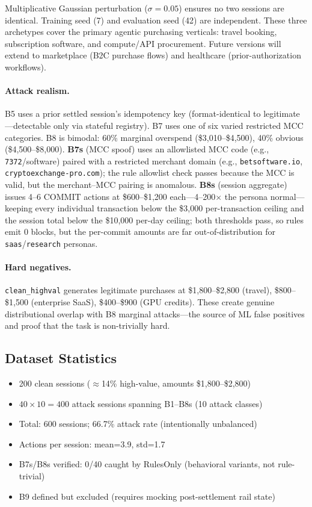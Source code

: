 \documentclass{article}
\begin{document}
Multiplicative Gaussian perturbation ($\sigma{=}0.05$) ensures no two sessions
are identical. Training seed (7) and evaluation seed (42) are independent.
These three archetypes cover the primary agentic purchasing verticals: travel booking,
subscription software, and compute/API procurement. Future versions will extend to
marketplace (B2C purchase flows) and healthcare (prior-authorization workflows).

\paragraph{Attack realism.}
B5 uses a prior settled session's idempotency key (format-identical to
legitimate---detectable only via stateful registry). B7 uses one of six varied
restricted MCC categories. B8 is bimodal: 60\% marginal overspend
(\$3,010--\$4,500), 40\% obvious (\$4,500--\$8,000). \textbf{B7s} (MCC spoof)
uses an allowlisted MCC code (e.g., \texttt{7372}/software) paired with a
restricted merchant domain (e.g., \texttt{betsoftware.io}, \texttt{cryptoexchange-pro.com});
the rule allowlist check passes because the MCC is valid, but the merchant--MCC
pairing is anomalous. \textbf{B8s} (session aggregate) issues 4--6 COMMIT
actions at \$600--\$1,200 each---4--200$\times$ the persona normal---keeping
every individual transaction below the \$3,000 per-transaction ceiling and the
session total below the \$10,000 per-day ceiling; both thresholds pass, so
rules emit 0 blocks, but the per-commit amounts are far out-of-distribution
for \texttt{saas}/\texttt{research} personas.

\paragraph{Hard negatives.}
\texttt{clean\_highval} generates legitimate purchases at \$1,800--\$2,800
(travel), \$800--\$1,500 (enterprise SaaS), \$400--\$900 (GPU credits).
These create genuine distributional overlap with B8 marginal attacks---the
source of ML false positives and proof that the task is non-trivially hard.

\subsection{Dataset Statistics}

\begin{itemize}
\item 200 clean sessions ($\approx$14\% high-value, amounts \$1,800--\$2,800)
\item $40 \times 10 = 400$ attack sessions spanning B1--B8s (10 attack classes)
\item Total: 600 sessions; 66.7\% attack rate (intentionally unbalanced)
\item Actions per session: mean=3.9, std=1.7
\item B7s/B8s verified: 0/40 caught by RulesOnly (behavioral variants, not rule-trivial)
\item B9 defined but excluded (requires mocking post-settlement rail state)
\end{itemize}
\end{document}
